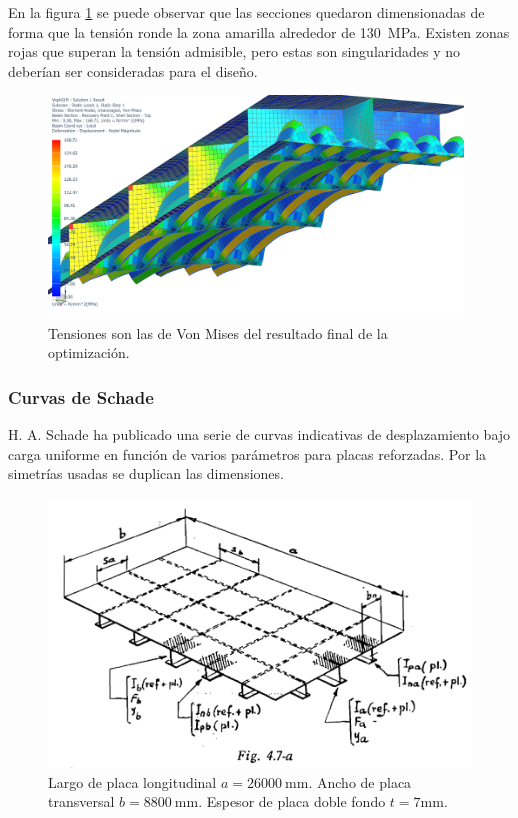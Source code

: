 \documentclass[onecolumn,10pt,titlepage]{article}
\begin{document}
En la figura \ref{fig:optimizacion} se puede observar que las secciones quedaron dimensionadas de forma que la tensión ronde la zona amarilla alrededor de \SI{130}{\mega\pascal}. Existen zonas rojas que superan la tensión admisible, pero estas son singularidades y no deberían ser consideradas para el diseño.

 \begin{figure}
     \centering
     \includegraphics[width=11cm]{fig/VoptiSIM.png}
     \caption{Tensiones son las de Von Mises del resultado final de la optimización.}
     \label{fig:optimizacion}
 \end{figure}

\subsubsection*{Curvas de Schade}
H. A. Schade ha publicado una serie de curvas indicativas de desplazamiento bajo carga uniforme en función de varios parámetros para placas reforzadas. Por la simetrías usadas se duplican las dimensiones.
\begin{figure}[htb!]
	\centering
	\includegraphics[width=.7\textwidth]{fig/placaschade.png}
	\caption{Largo de placa longitudinal $a=\SI{26000}{\milli \meter}$. Ancho de placa transversal $b=\SI{8800}{\milli\meter}$. Espesor de placa doble fondo $t=7\si{\milli \meter}$.}
	\label{fig:placaschade}
\end{figure}
\end{document}
